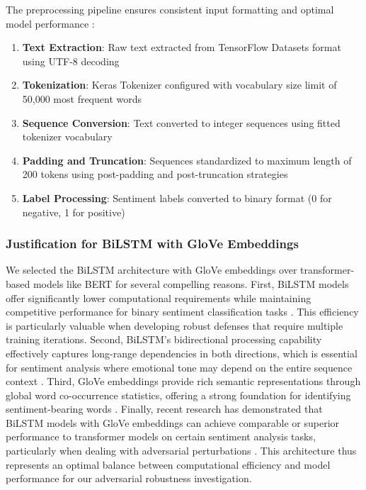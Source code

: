 \documentclass[../main.tex]{subfiles}
\begin{document}
The preprocessing pipeline ensures consistent input formatting and optimal model performance \cite{kumar2023amc}:

\begin{enumerate}
\item \textbf{Text Extraction}: Raw text extracted from TensorFlow Datasets format using UTF-8 decoding
\item \textbf{Tokenization}: Keras Tokenizer configured with vocabulary size limit of 50,000 most frequent words
\item \textbf{Sequence Conversion}: Text converted to integer sequences using fitted tokenizer vocabulary
\item \textbf{Padding and Truncation}: Sequences standardized to maximum length of 200 tokens using post-padding and post-truncation strategies
\item \textbf{Label Processing}: Sentiment labels converted to binary format (0 for negative, 1 for positive)
\end{enumerate}

\subsubsection{Justification for BiLSTM with GloVe Embeddings}

We selected the BiLSTM architecture with GloVe embeddings over transformer-based models like BERT for several compelling reasons. First, BiLSTM models offer significantly lower computational requirements while maintaining competitive performance for binary sentiment classification tasks \cite{li2022glove}\cite{kumar2023amc}. This efficiency is particularly valuable when developing robust defenses that require multiple training iterations. Second, BiLSTM's bidirectional processing capability effectively captures long-range dependencies in both directions, which is essential for sentiment analysis where emotional tone may depend on the entire sequence context \cite{pimpalkar2022mblstmglove}. Third, GloVe embeddings provide rich semantic representations through global word co-occurrence statistics, offering a strong foundation for identifying sentiment-bearing words \cite{li2022glove}. Finally, recent research has demonstrated that BiLSTM models with GloVe embeddings can achieve comparable or superior performance to transformer models on certain sentiment analysis tasks, particularly when dealing with adversarial perturbations \cite{kumar2023amc}\cite{pimpalkar2022mblstmglove}. This architecture thus represents an optimal balance between computational efficiency and model performance for our adversarial robustness investigation.
\end{document}

